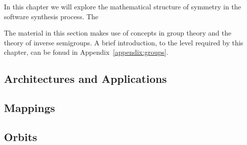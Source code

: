 In this chapter we will explore the mathematical structure of symmetry in the software synthesis process. The
\blindtext[2]

The material in this section makes use of concepts in group theory and the theory of inverse semigroups. A brief introduction, to the level required by this chapter, can be fonud in Appendix~\ref{appendix:groups}.

\subsection{Architectures and Applications}
\Blindtext[5]

\subsection{Mappings}
\Blindtext[5]

\subsection{Orbits}
\Blindtext[5]